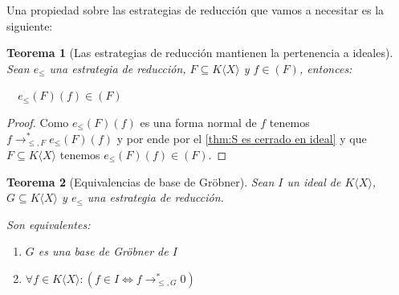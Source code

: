 \documentclass{amsbook}
\theoremstyle{customstyle}
\newtheorem{theorem}{Teorema}[section]
\begin{document}
Una propiedad sobre las estrategias de reducción que vamos a necesitar es la siguiente:

\begin{theorem}[Las estrategias de reducción mantienen la pertenencia a ideales]\label{thm:e mantiene pertenencia a ideal}
Sean $e_≤$ una estrategia de reducción, $F ⊆ K⟨X⟩$ y $f ∈ (F)$, entonces:

  $e_≤(F)(f) ∈ (F)$

\end{theorem}
\begin{proof}
Como $e_≤(F)(f)$ es una forma normal de $f$ tenemos $f →^*_{≤, F} e_≤(F)(f)$ y por ende por el \cref{thm:S es cerrado en ideal} y que $F ⊆ K⟨X⟩$ tenemos $e_≤(F)(f) ∈ (F)$.
\end{proof}


\begin{theorem}[Equivalencias de base de Gröbner]\label{thm:equivalencias de base de Gröbner}
Sean $I$ un ideal de $K⟨X⟩$, $G ⊆ K⟨X⟩$ y $e_≤$ una estrategia de reducción.

Son equivalentes:
\begin{enumerate}
\item $G$ es una base de Gröbner de $I$

\item $∀f ∈ K⟨X⟩ : (f ∈ I ⇔ f →^*_{≤, G} 0)$

\end{enumerate}

\end{theorem}
\end{document}
